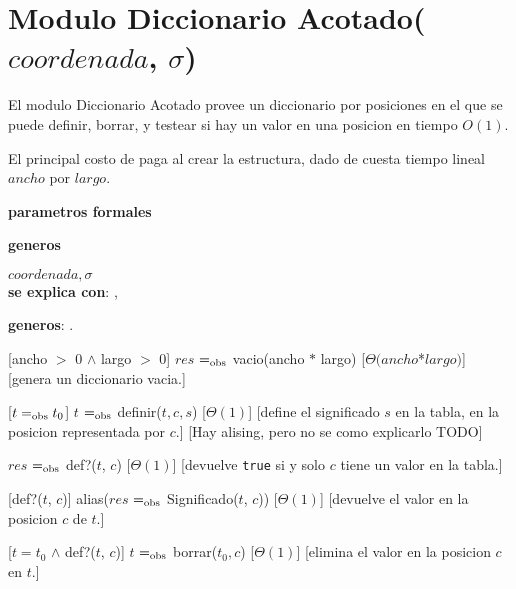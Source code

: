 \section{Modulo Diccionario Acotado($coordenada$, $\sigma$)}

El modulo Diccionario Acotado provee un diccionario por posiciones en el que se puede definir, borrar, y testear si hay un valor en una posicion en tiempo $O(1)$. 

El principal costo de paga al crear la estructura, dado de cuesta tiempo lineal $ancho$ por $largo$.

\begin{Interfaz}

  \textbf{parametros formales}\parindent\\
  \parbox{1.7cm}{\textbf{generos}}$coordenada,\sigma$\\

  \textbf{se explica con}: ,

  \textbf{generos}: .


  [ancho $>$ 0 $\land$ largo $>$ 0]
  {$res$ $=_{\mathrm{obs}}$ vacio(ancho $*$ largo)}%
  [$\Theta(ancho $*$ largo)$]
  [genera un diccionario vacia.]

  [$t =_{\mathrm{obs}} t_0$]
  {$t$ $=_{\mathrm{obs}}$ definir($t, c, s$)}
  [$\Theta(1)$]
  [define el significado $s$ en la tabla, en la posicion representada por $c$.]
  [Hay alising, pero no se como explicarlo TODO]

  {$res$ $=_{\mathrm{obs}}$ def?($t$, $c$)}
  [$\Theta(1)$]
  [devuelve \texttt{true} si y solo $c$ tiene un valor en la tabla.]

  [def?($t$, $c$)]
  {alias($res$ $=_{\mathrm{obs}}$ Significado($t$, $c$))}
  [$\Theta(1)$]
  [devuelve el valor en la posicion $c$ de $t$.]

  [$t = t_0$ $\land$ def?($t$, $c$)]
  {$t$ $=_{\mathrm{obs}}$ borrar($t_0, c$)}
  [$\Theta(1)$]
  [elimina el valor en la posicion $c$ en $t$.]


\end{Interfaz}
